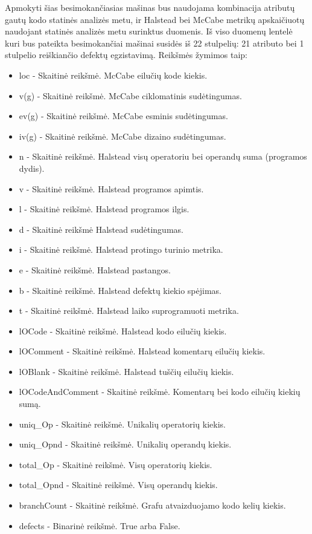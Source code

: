 \documentclass{VUMIFPSbakalaurinis}
\begin{document}
Apmokyti šias besimokančiasias mašinas bus naudojama kombinacija atributų gautų kodo statinės analizės metu, ir Halstead bei McCabe metrikų apskaičiuotų naudojant statinės analizės metu surinktus duomenis. Iš viso duomenų lentelė kuri bus pateikta besimokančiai mašinai susidės iš 22 stulpelių: 21 atributo bei 1 stulpelio reiškiančio defektų egzistavimą. Reikšmės žymimos taip:
\begin{itemize} 
\item[] loc - Skaitinė reikšmė. McCabe eilučių kode kiekis.
\item[] v(g) - Skaitinė reikšmė. McCabe ciklomatinis sudėtingumas.
\item[] ev(g) - Skaitinė reikšmė. McCabe esminis sudėtingumas.
\item[] iv(g) - Skaitinė reikšmė. McCabe dizaino sudėtingumas.
\item[] n - Skaitinė reikšmė. Halstead visų operatoriu bei operandų suma (programos dydis).
\item[] v - Skaitinė reikšmė. Halstead programos apimtis.
\item[] l - Skaitinė reikšmė. Halstead programos ilgis.
\item[] d - Skaitinė reikšmė Halstead sudėtingumas.
\item[] i - Skaitinė reikšmė. Halstead protingo turinio metrika.
\item[] e - Skaitinė reikšmė. Halstead pastangos.
\item[] b - Skaitinė reikšmė. Halstead defektų kiekio spėjimas.
\item[] t - Skaitinė reikšmė. Halstead laiko suprogramuoti metrika.
\item[] lOCode - Skaitinė reikšmė. Halstead kodo eilučių kiekis.
\item[] lOComment - Skaitinė reikšmė. Halstead komentarų eilučių kiekis.
\item[] lOBlank - Skaitinė reikšmė. Halstead tuščių eilučių kiekis.
\item[] lOCodeAndComment - Skaitinė reikšmė. Komentarų bei kodo eilučių kiekių sumą.
\item[] uniq\_Op - Skaitinė reikšmė. Unikalių operatorių kiekis.
\item[] uniq\_Opnd - Skaitinė reikšmė. Unikalių operandų kiekis.
\item[] total\_Op - Skaitinė reikšmė. Visų operatorių kiekis.
\item[] total\_Opnd - Skaitinė reikšmė. Visų operandų kiekis.
\item[] branchCount - Skaitinė reikšmė. Grafu atvaizduojamo kodo kelių kiekis.
\item[] defects - Binarinė reikšmė. True arba False.
\end{itemize} 
\end{document}
